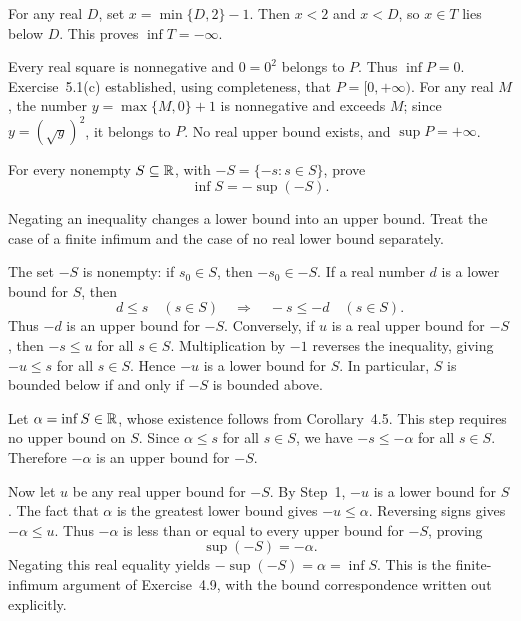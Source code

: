 For any real $D$, set $x=\min\{D,2\}-1$. Then $x<2$ and $x<D$,
so $x\in T$ lies below $D$. This proves $\inf T=-\infty$.

Every real square is nonnegative and $0=0^2$ belongs to $P$.
Thus $\inf P=0$. Exercise~5.1(c) established, using completeness,
that $P=[0,+\infty)$. For any real $M$, the number
$y=\max\{M,0\}+1$ is nonnegative and exceeds $M$; since
$y=(\sqrt y)^2$, it belongs to $P$. No real upper bound exists,
and $\sup P=+\infty$.


\goal For every nonempty $S\subseteq\mathbb{R}$, with
$-S=\{-s:s\in S\}$, prove
\[
 \inf S=-\sup(-S).
\]

\idea Negating an inequality changes a lower bound into an upper
bound. Treat the case of a finite infimum and the case of no real
lower bound separately.

The set $-S$ is nonempty: if $s_0\in S$, then $-s_0\in-S$.
If a real number $d$ is a lower bound for $S$, then
\[
 d\le s\quad(s\in S)
 \quad\Longrightarrow\quad -s\le-d\quad(s\in S).
\]
Thus $-d$ is an upper bound for $-S$. Conversely, if $u$ is a real
upper bound for $-S$, then $-s\le u$ for all $s\in S$.
Multiplication by $-1$ reverses the inequality, giving $-u\le s$
for all $s\in S$. Hence $-u$ is a lower bound for $S$.
In particular, $S$ is bounded below if and only if $-S$ is bounded above.

Let $\alpha=\inf S\in\mathbb{R}$, whose existence follows from
Corollary~4.5. This step requires no upper bound on $S$.
Since $\alpha\le s$ for all $s\in S$, we have
$-s\le-\alpha$ for all $s\in S$. Therefore $-\alpha$ is an
upper bound for $-S$.

Now let $u$ be any real upper bound for $-S$. By Step~1, $-u$ is
a lower bound for $S$. The fact that $\alpha$ is the greatest lower
bound gives $-u\le\alpha$. Reversing signs gives
$-\alpha\le u$. Thus $-\alpha$ is less than or equal to every
upper bound for $-S$, proving
\[
 \sup(-S)=-\alpha.
\]
Negating this real equality yields
$-\sup(-S)=\alpha=\inf S$. This is the finite-infimum argument of
Exercise~4.9, with the bound correspondence written out explicitly.

